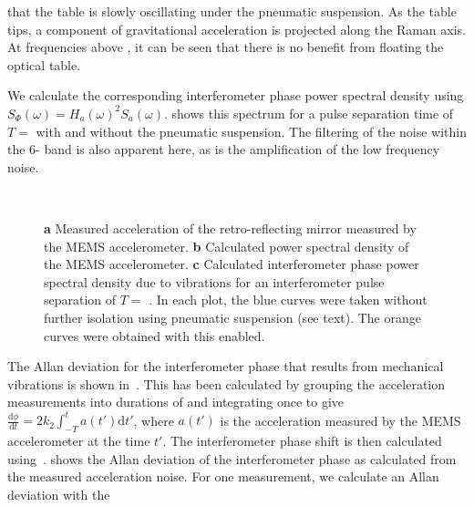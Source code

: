 that the table is slowly oscillating under the pneumatic suspension.
As the table tips, a component of gravitational acceleration is
projected along the Raman axis. At frequencies above
, it can be seen that there is no benefit from
floating the optical table. 
\par\noindent
We calculate the corresponding interferometer phase power spectral
density using
$S_\Phi(\omega) = H_a(\omega)^2 S_a(\omega)$.
 shows this spectrum for a pulse
separation time of $T = $  with and
without the pneumatic suspension. The filtering of the noise within
the 6- band is also apparent here, as is the
amplification of the low frequency noise. 
\begin{figure}[htpb!]
  \centering
  \\
  \caption[Interferometer power spectral density due to vibration
  noise.]{\textbf{a} Measured acceleration of the retro-reflecting mirror
    measured by the MEMS accelerometer. \textbf{b} Calculated power
    spectral density of the MEMS accelerometer. \textbf{c} Calculated interferometer 
  phase power spectral density due to vibrations for an interferometer
pulse separation of $T = $ . In each plot, the blue
curves were taken without further isolation using pneumatic suspension
(see text). The orange curves were obtained with this enabled.} 
  \label{fig:vibration_spectrum}
\end{figure}
\par\noindent
The Allan deviation for the interferometer phase that results from
mechanical vibrations is shown
in~. This has been calculated by
grouping the acceleration measurements into durations of
 and integrating once to give
$\frac{\mathrm{d}\phi}{\mathrm{d} t} = 2 k_2 \int_{-T}^{t} a(t')
\mathrm{d} t'$, where $a(t')$ is the acceleration measured by the MEMS
accelerometer at the time $t'$. The interferometer phase shift is then
calculated using~. 
 shows the Allan
deviation of the interferometer phase as calculated from the measured
acceleration noise. 
For one measurement, we calculate an Allan deviation with the
